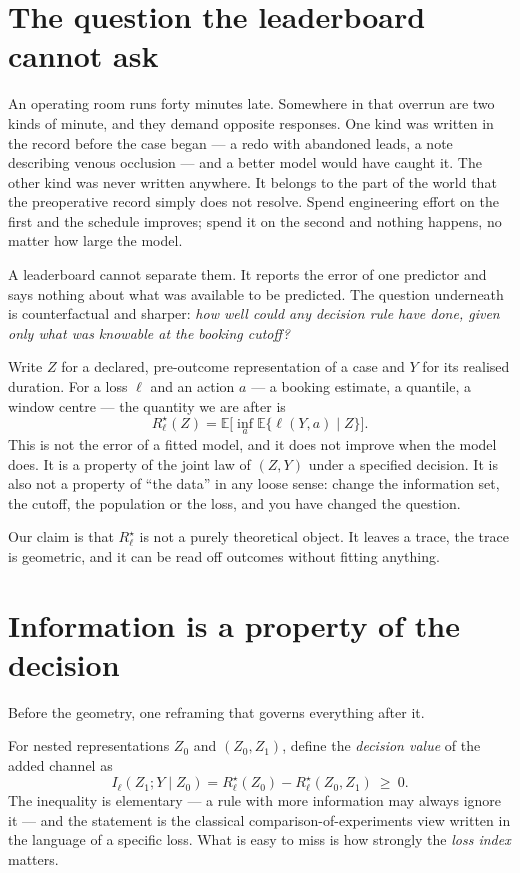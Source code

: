 \documentclass[11pt,a4paper]{article}
\newcommand{\risk}{R^{\star}}
\begin{document}
\section{The question the leaderboard cannot ask}

An operating room runs forty minutes late. Somewhere in that overrun are two kinds of minute, and they demand opposite responses. One kind was written in the record before the case began --- a redo with abandoned leads, a note describing venous occlusion --- and a better model would have caught it. The other kind was never written anywhere. It belongs to the part of the world that the preoperative record simply does not resolve. Spend engineering effort on the first and the schedule improves; spend it on the second and nothing happens, no matter how large the model.

A leaderboard cannot separate them. It reports the error of one predictor and says nothing about what was available to be predicted. The question underneath is counterfactual and sharper: \emph{how well could any decision rule have done, given only what was knowable at the booking cutoff?}

Write $Z$ for a declared, pre-outcome representation of a case and $Y$ for its realised duration. For a loss $\ell$ and an action $a$ --- a booking estimate, a quantile, a window centre --- the quantity we are after is
\begin{equation}
\risk_\ell(Z)=\mathbb E\Big[\inf_a\mathbb E\{\ell(Y,a)\mid Z\}\Big].\label{eq:bayes}
\end{equation}
This is not the error of a fitted model, and it does not improve when the model does. It is a property of the joint law of $(Z,Y)$ under a specified decision. It is also not a property of ``the data'' in any loose sense: change the information set, the cutoff, the population or the loss, and you have changed the question.

Our claim is that $\risk_\ell$ is not a purely theoretical object. It leaves a trace, the trace is geometric, and it can be read off outcomes without fitting anything.

\section{Information is a property of the decision}

Before the geometry, one reframing that governs everything after it.

For nested representations $Z_0$ and $(Z_0,Z_1)$, define the \emph{decision value} of the added channel as
\begin{equation}
I_\ell(Z_1;Y\mid Z_0)=\risk_\ell(Z_0)-\risk_\ell(Z_0,Z_1)\ \geq\ 0.\label{eq:info}
\end{equation}
The inequality is elementary --- a rule with more information may always ignore it --- and the statement is the classical comparison-of-experiments view\cite{blackwell} written in the language of a specific loss. What is easy to miss is how strongly the \emph{loss index} matters.
\end{document}
